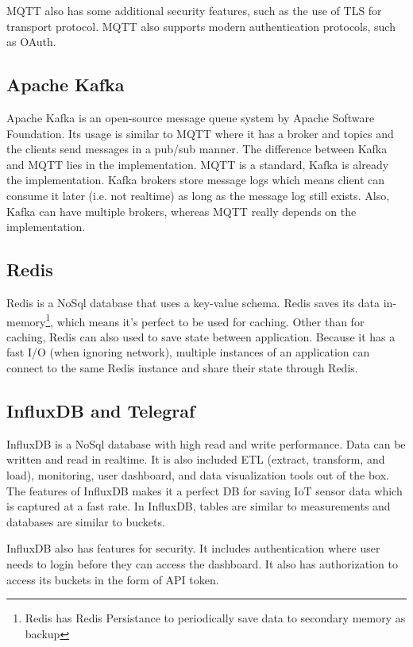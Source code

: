 MQTT also has some additional security features, such as the use of TLS
for transport protocol. MQTT also supports modern authentication protocols, such
as OAuth\cite{mqtt_org}.

\subsection{Apache Kafka}

Apache Kafka is an open-source message queue system by Apache Software
Foundation. Its usage is similar to MQTT where it has a broker and topics and
the clients send messages in a pub/sub manner. The difference between Kafka and
MQTT lies in the implementation. MQTT is a standard, Kafka is already
the implementation. Kafka brokers store message logs which means client can
consume it later (i.e. not realtime) as long as the message log still exists.
Also, Kafka can have multiple brokers, whereas MQTT really depends on the
implementation.

\subsection{Redis}

Redis is a NoSql database that uses a key-value schema. Redis saves its data
in-memory\footnote{Redis has Redis Persistance to periodically save data to
	secondary memory as backup}, which means it's perfect to be used for
caching. Other than for caching, Redis can also used to save state between
application. Because it has a fast I/O (when ignoring network), multiple
instances of an application can connect to the same Redis instance and share
their state through Redis.

\subsection{InfluxDB and Telegraf}

InfluxDB is a NoSql database with high read and write performance. Data can be
written and read in realtime. It is also included ETL (extract, transform, and
load), monitoring, user dashboard, and data visualization tools out of the box.
The features of InfluxDB makes it a perfect DB for saving IoT sensor data which
is captured at a fast rate. In InfluxDB, tables are similar to measurements and
databases are similar to buckets.

InfluxDB also has features for security. It includes authentication where user
needs to login before they can access the dashboard. It also has authorization
to access its buckets in the form of API token.

